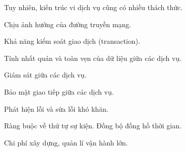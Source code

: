 Tuy nhiên, kiến trúc vi dịch vụ cũng có nhiều thách thức.

Chịu ảnh hưởng của đường truyền mạng.

Khả năng kiểm soát giao dịch (transaction).

Tính nhất quán và toàn vẹn của dữ liệu giữa các dịch vụ.

Giám sát giữa các dịch vụ.

Bảo mật giao tiếp giữa các dịch vụ.

Phát hiện lỗi và sửa lỗi khó khăn.

Ràng buộc về thứ tự sự kiện.
Đồng bộ đồng hồ thời gian.

Chi phí xây dựng, quản lí vận hành lớn.
